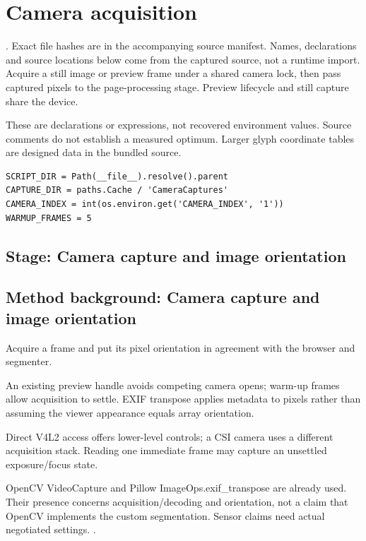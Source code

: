 \chapter{Camera acquisition}\label{module:web-camera}
. Exact file hashes are in the accompanying source manifest. Names, declarations and source locations below come from the captured source, not a runtime import.
Acquire a still image or preview frame under a shared camera lock, then pass captured pixels to the page-processing stage. Preview lifecycle and still capture share the device.


These are declarations or expressions, not recovered environment values. Source comments do not establish a measured optimum. Larger glyph coordinate tables are designed data in the bundled source.
\begin{lstlisting}[style=plain]
SCRIPT_DIR = Path(__file__).resolve().parent
CAPTURE_DIR = paths.Cache / 'CameraCaptures'
CAMERA_INDEX = int(os.environ.get('CAMERA_INDEX', '1'))
WARMUP_FRAMES = 5
\end{lstlisting}
\section*{Stage: Camera capture and image orientation}
\section{Method background: Camera capture and image orientation}\label{method:camera}
Acquire a frame and put its pixel orientation in agreement with the browser and segmenter.


An existing preview handle avoids competing camera opens; warm-up frames allow acquisition to settle. EXIF transpose applies metadata to pixels rather than assuming the viewer appearance equals array orientation.


Direct V4L2 access offers lower-level controls; a CSI camera uses a different acquisition stack. Reading one immediate frame may capture an unsettled exposure/focus state.


OpenCV VideoCapture and Pillow ImageOps.exif\_transpose are already used. Their presence concerns acquisition/decoding and orientation, not a claim that OpenCV implements the custom segmentation. Sensor claims need actual negotiated settings. \cite{opencvcamera,pillowops}.


